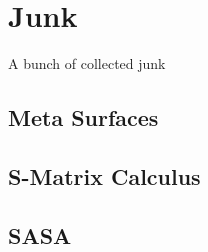\section{Junk} \label{sec:results}
A bunch of collected junk

\subsection{Meta Surfaces} \label{sec:MS}

\newpage

\subsection{S-Matrix Calculus}

\newpage

\subsection{SASA}

\newpage

